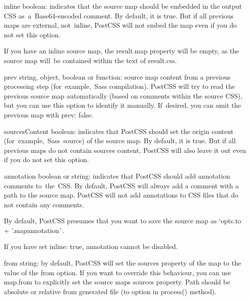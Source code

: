 \begin{DoxyItemize}
\item {\ttfamily inline} boolean\+: indicates that the source map should be embedded in the output C\+SS as a \+Base64-\/encoded comment. By default, it is {\ttfamily true}. But if all previous maps are external, not inline, Post\+C\+SS will not embed the map even if you do not set this option.

If you have an inline source map, the {\ttfamily result.\+map} property will be empty, as the source map will be contained within the text of {\ttfamily result.\+css}.
\item {\ttfamily prev} string, object, boolean or function\+: source map content from a previous processing step (for example, \+Sass compilation). Post\+C\+SS will try to read the previous source map automatically (based on comments within the source C\+SS), but you can use this option to identify it manually. If desired, you can omit the previous map with {\ttfamily prev\+: false}.
\item {\ttfamily sources\+Content} boolean\+: indicates that Post\+C\+SS should set the origin content (for example, \+Sass source) of the source map. By default, it is {\ttfamily true}. But if all previous maps do not contain sources content, Post\+C\+SS will also leave it out even if you do not set this option.
\item {\ttfamily annotation} boolean or string\+: indicates that Post\+C\+SS should add annotation comments to the \+C\+SS. By default, Post\+C\+SS will always add a comment with a path to the source map. Post\+C\+SS will not add annotations to C\+SS files that do not contain any comments.

By default, Post\+C\+SS presumes that you want to save the source map as `opts.\+to + '.mapannotation\`{}.

If you have set {\ttfamily inline\+: true}, annotation cannot be disabled.
\item {\ttfamily from} string\+: by default, Post\+C\+SS will set the {\ttfamily sources} property of the map to the value of the {\ttfamily from} option. If you want to override this behaviour, you can use {\ttfamily map.\+from} to explicitly set the source map\textquotesingle{}s {\ttfamily sources} property. Path should be absolute or relative from generated file ({\ttfamily to} option in {\ttfamily process()} method). 
\end{DoxyItemize}